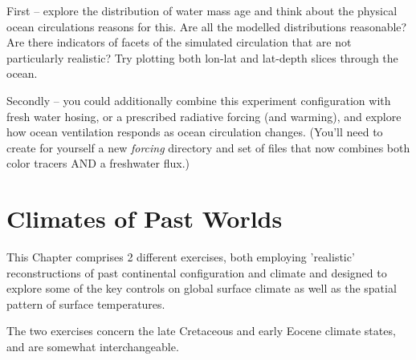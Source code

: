 \documentclass[11pt,fleqn]{book} %
\begin{document}
First -- explore the distribution of water mass age and think about the physical ocean circulations reasons for this. Are all the modelled distributions reasonable? Are there indicators of facets of the simulated circulation that are not particularly realistic? Try plotting both lon-lat and lat-depth slices through the ocean.

Secondly -- you could additionally combine this experiment configuration with fresh water hosing, or a prescribed radiative forcing (and warming), and explore how ocean ventilation responds as ocean circulation changes. (You'll need to create for yourself a new \textit{forcing} directory and set of files that now combines both color tracers AND a freshwater flux.)


\cleardoublepage


\chapter{Climates of Past Worlds}\label{ch:past-worlds}

\hfill \break

\vspace{12mm}

\noindent This Chapter comprises 2 different exercises, both employing 'realistic' reconstructions of past continental configuration and climate and designed to explore some of the key controls on global surface climate as well as the spatial pattern of surface temperatures.

The two exercises concern the late Cretaceous and early Eocene climate states, and are somewhat interchangeable.
\end{document}
